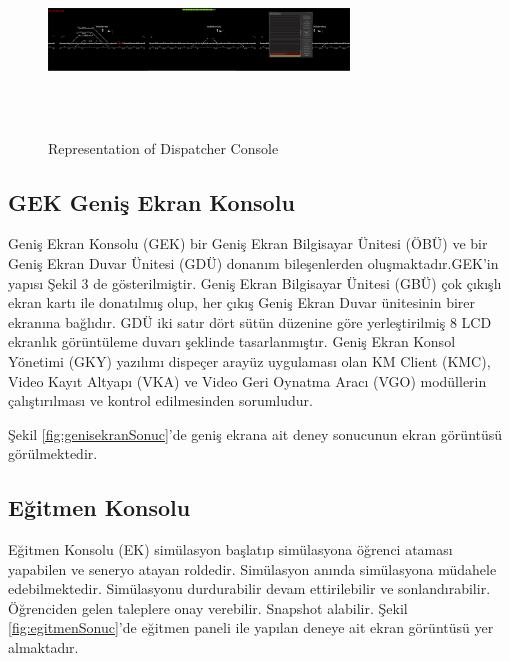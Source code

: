 \documentclass[conference]{IEEEtran}
\begin{document}
\begin{figure}[h!]
  \centering
  \includegraphics[width=8cm,height=5cm]{ogrenci.jpg}
  \caption{Representation of Dispatcher Console}\label{fig:smclass}
\end{figure}



\subsection{GEK Geniş Ekran Konsolu}

Geniş Ekran Konsolu (GEK) bir Geniş Ekran Bilgisayar Ünitesi (ÖBÜ) ve bir Geniş Ekran Duvar Ünitesi (GDÜ) donanım bileşenlerden oluşmaktadır.GEK’in yapısı Şekil 3 de gösterilmiştir.
Geniş Ekran Bilgisayar Ünitesi (GBÜ) çok çıkışlı ekran kartı ile donatılmış olup, her çıkış Geniş Ekran Duvar ünitesinin birer ekranına bağlıdır. GDÜ iki satır dört sütün düzenine göre yerleştirilmiş 8 LCD ekranlık görüntüleme duvarı şeklinde tasarlanmıştır. Geniş Ekran Konsol Yönetimi (GKY) yazılımı dispeçer arayüz uygulaması olan KM Client (KMC), Video Kayıt Altyapı (VKA) ve Video Geri Oynatma Aracı (VGO) modüllerin çalıştırılması ve kontrol edilmesinden sorumludur.


Şekil \ref{fig:genisekranSonuc}'de geniş ekrana ait deney sonucunun ekran görüntüsü görülmektedir.


\subsection{Eğitmen Konsolu}

Eğitmen Konsolu (EK) simülasyon başlatıp simülasyona öğrenci ataması yapabilen ve seneryo atayan roldedir. Simülasyon anında simülasyona müdahele edebilmektedir. Simülasyonu durdurabilir devam ettirilebilir ve sonlandırabilir. Öğrenciden gelen taleplere onay verebilir. Snapshot alabilir. Şekil \ref{fig:egitmenSonuc}'de eğitmen paneli ile yapılan deneye ait ekran görüntüsü yer almaktadır.
\end{document}

